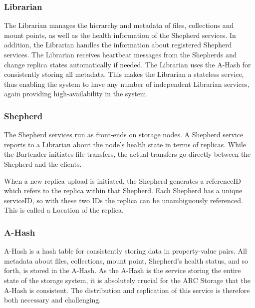 \documentclass[final]{ieee}
\begin{document}
\subsubsection{Librarian}
\label{librarian}
The Librarian manages the hierarchy and metadata of
files, collections and mount points, as well as the health information of the Shepherd
services. In addition, the Librarian handles
the information about registered Shepherd services. The Librarian receives
heartbeat messages from the Shepherds and change replica states automatically
if needed. The Librarian uses the A-Hash for consistently storing all metadata. This makes the
Librarian a stateless service, thus enabling the system to have any
number of independent
Librarian services, again providing high-availability in the
system.

\subsubsection{Shepherd}
\label{Shepherd}

The Shepherd services run as front-ends on storage nodes. A Shepherd
service reports to a Librarian about the 
node's health state in terms of replicas. While the Bartender initiates
file transfers, the actual transfers go directly between the Shepherd
and the clients.
 
When a new replica upload
is initiated, the Shepherd generates a referenceID which refers to
the replica within
that Shepherd. Each Shepherd has a unique serviceID, so with these two
IDs the replica can be unambiguously referenced. This is called a Location
of the replica. %



\subsubsection{A-Hash}
\label{Hash Algorithm}

A-Hash is a hash table for consistently storing data in property-value
pairs. All metadata about files, collections, mount point, Shepherd's
health status, and so forth, is stored in the A-Hash. As the A-Hash is
the service storing the entire state of the storage system, it is
absolutely crucial for the ARC Storage that the A-Hash is
consistent. The distribution and replication of this service is
therefore both necessary and challenging.
\end{document}
